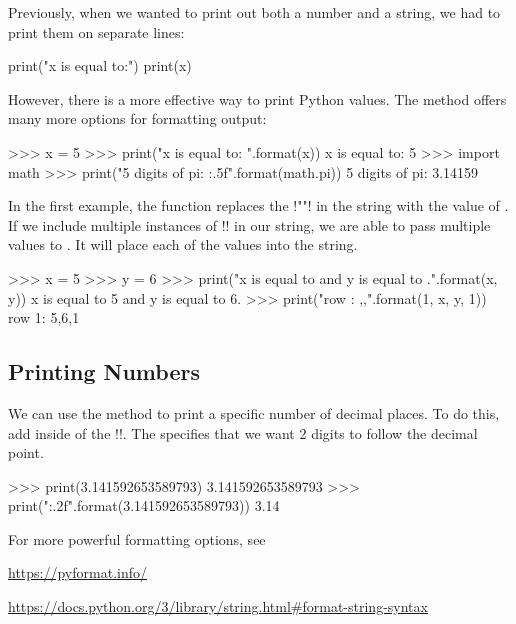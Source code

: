\documentclass[11pt]{cselabheader}
\begin{document}
Previously, when we wanted to print out both a number and a string, we
had to print them on separate lines:

\begin{python3code}
print("x is equal to:")
print(x)
\end{python3code}

However, there is a more effective way to print Python values.
The  method offers many more options
for formatting output:

\begin{pyconcode}
>>> x = 5
>>> print("x is equal to: {}".format(x))
x is equal to: 5
>>> import math
>>> print("5 digits of pi: {:.5f}".format(math.pi))
5 digits of pi: 3.14159

\end{pyconcode}

In the first example, the function replaces the \pythoninline!"{}"! in
the string with the value of .  If we include multiple
instances of \pythoninline!{}! in our string, we are able to pass
multiple values to . It will place each of
the values into the string.

\begin{pyconcode}
>>> x = 5
>>> y = 6
>>> print("x is equal to {} and y is equal to {}.".format(x, y))
x is equal to 5 and y is equal to 6.
>>> print("row {}: {},{},{}".format(1, x, y, 1))
row 1: 5,6,1

\end{pyconcode}


\subsection{Printing Numbers}

We can use the  method to print a specific
number of decimal places. To do this, add  inside
of the \pythoninline!{}!. The  specifies that we
want 2 digits to follow the decimal point.

\begin{pyconcode}
>>> print(3.141592653589793)
3.141592653589793
>>> print("{:.2f}".format(3.141592653589793))
3.14

\end{pyconcode}

For more powerful formatting options, see
\begin{center}
  \vspace{-2mm}
  \url{https://pyformat.info/}

  \url{https://docs.python.org/3/library/string.html#format-string-syntax}
  \vspace{-2mm}
\end{center}
\end{document}
